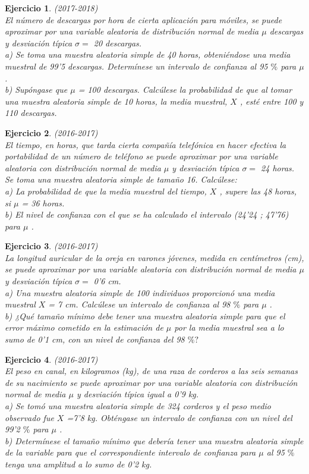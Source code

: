 \documentclass[12pt, a4paper]{amsart}
\newtheorem{ejer}{Ejercicio}
\begin{document}
\begin{ejer}\em (2017-2018)\\
El número de descargas por hora de cierta aplicación para móviles, se puede aproximar por una variable
aleatoria de distribución normal de media $\mu$ descargas y desviación típica  $\sigma =$ 20 descargas.\\
a) Se toma una muestra aleatoria simple de 40 horas, obteniéndose una media muestral de 99’5 descargas.
Determínese un intervalo de confianza al 95 $\%$ para $\mu$ .\\
b) Supóngase que $\mu$ = 100 descargas. Calcúlese la probabilidad de que al tomar una muestra aleatoria simple
de 10 horas, la media muestral, $X$ , esté entre 100 y 110 descargas.
\end{ejer}

\begin{ejer}\em (2016-2017)\\
El tiempo, en horas, que tarda cierta compañía telefónica en hacer efectiva la portabilidad de un número de
teléfono se puede aproximar por una variable aleatoria con distribución normal de media $\mu$ y desviación típica
 $\sigma =$ 24 horas. Se toma una muestra aleatoria simple de tamaño 16. Calcúlese:\\
a) La probabilidad de que la media muestral del tiempo, $X$ , supere las 48 horas, si $\mu$ = 36 horas.\\
b) El nivel de confianza con el que se ha calculado el intervalo (24’24 ; 47’76) para $\mu$ .
\end{ejer}

\begin{ejer}\em (2016-2017)\\
La longitud auricular de la oreja en varones jóvenes, medida en centímetros (cm), se puede aproximar por una
variable aleatoria con distribución normal de media $\mu$ y desviación típica  $\sigma =$ 0’6 cm.\\
a) Una muestra aleatoria simple de 100 individuos proporcionó una media muestral $X$ = 7 cm. Calcúlese un
intervalo de confianza al 98 $\%$ para $\mu$ .\\
b) ¿Qué tamaño mínimo debe tener una muestra aleatoria simple para que el error máximo cometido en la
estimación de $\mu$ por la media muestral sea a lo sumo de 0’1 cm, con un nivel de confianza del 98 $\%?$
\end{ejer}

\begin{ejer}\em (2016-2017)\\
El peso en canal, en kilogramos (kg), de una raza de corderos a las seis semanas de su nacimiento se puede
aproximar por una variable aleatoria con distribución normal de media $\mu$ y desviación típica igual a 0’9 kg.\\
a) Se tomó una muestra aleatoria simple de 324 corderos y el peso medio observado fue $X$ =7’8 kg. Obténgase
un intervalo de confianza con un nivel del 99’2 $\%$ para $\mu$ .\\
b) Determínese el tamaño mínimo que debería tener una muestra aleatoria simple de la variable para que el
correspondiente intervalo de confianza para $\mu$ al 95 $\%$ tenga una amplitud a lo sumo de 0’2 kg.
\end{ejer}
\end{document}
